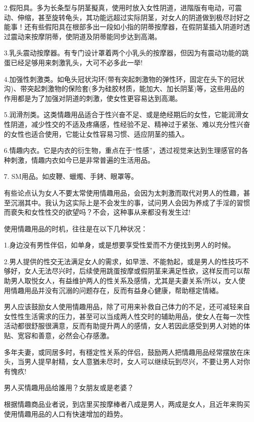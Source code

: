 \documentclass[12pt,UTF8]{ctexbook}
\begin{document}
2.假阳具。多为长条型与阴茎擬真，使用时放入女性阴道，进階版有电动，可震动、伸缩，甚至旋转龟头，其功能远超过实际阴茎，对女人的阴道做到极尽討好之能事！还有些假阳具在根部多出一段如小指的阴蒂按摩器，在假阴茎插入阴道时透过震动来按摩阴蒂，使阴道及阴蒂能同步达到高潮。

3.乳头震动按摩器。有专门设计罩着两个小乳头的按摩器，但因为有震动功能的跳蛋已经足够用来刺激乳头，大可不必多此一举!

4.加强性刺激类。如龟头冠状沟环(带有突起刺激物的弹性环，固定在头下的冠状沟)、带突起刺激物的保险套(多为硅胶材质，能加大、加长阴茎)等，这些用品的作用都是为了加强对阴道的刺激，使女性更容易达到高潮。

5.润滑剂类。这类情趣用品适合于性兴奋不足、或是绝经期后的女性，它能润滑女性阴道，减少性交的不适及疼痛感，性经验不足、精神过于紧张、难以充分性兴奋的女性也适合使用，它能让女性容易习惯、适应阴茎的插入。

6.情趣内衣。它是内衣的衍生物，重点在于“性感”，透过视觉来达到生理感官的各种刺激，情趣内衣如今已是非常普遍的生活用品。

7. SM用品。如皮鞭、蠟燭、手銬、眼罩等。

有些论点认为女人不要太常使用情趣用品，会因为太刺激而取代对男人的性趣，甚至沉溺其中。我认为这实际上是不会发生的事，试问男人会因为养成了手淫的習惯而裵失和女性性交的欲望吗？不会，这种事从来都没有发生过!

使用情趣用品的时机，往往是在以下几种状况：

1.身边没有男性伴侣，如单身，或是想要享受性爱而不方便找到男人的时候。

2.男人提供的性交无法满足女人的需求，如早泄、不能勃起，或是男人的性技巧不够好，女人无法尽兴时，后续使用跳蛋按摩或假阴茎来满足性欲，这样反而可以帮助男人取悦女人，有益维护两人的性关系及感情，尤其是夫妻关系!所以，女人使用情趣用品并没有沉溺的问题存在，反而有益身心健康，帮助穩定情緒。

男人应该鼓励女人使用情趣用品，除了可用来补救自己体力的不足，还可减轻来自女性性生活需求的压力，甚至可以当成两人性交时的辅助用品，使女人在每一次性活动都很舒服很满意，反而有助提升两人的感情，女人若因此感受到男人对她的体贴、宽容和善意，必然会心存感激。

多年夫妻，或同居多时，有穩定性关系的伴侣，鼓励两人把情趣用品经常摆放在床头，当男人提早射精，女人意猶未尽时，女人可以继续玩到尽兴，不要让男人对你有愧疚!

男人买情趣用品给誰用？女朋友或是老婆？

根据情趣商品业者说，到店里买按摩棒者八成是男人，两成是女人，且近年来购买使用情趣用品的人口有快速增加的趋势。
\end{document}
